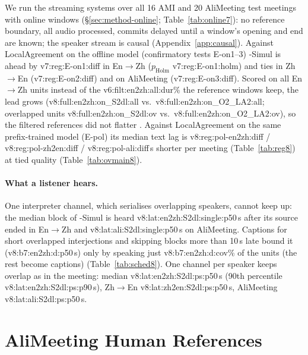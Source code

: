 We run the streaming systems over all 16 AMI and 20 AliMeeting test meetings with online windows
(\S\ref{sec:method-online}; Table~\ref{tab:online7}): no reference boundary, all audio processed, commits delayed until a
window's opening and end are known; the speaker stream is causal (Appendix~\ref{app:causal}). Against
LocalAgreement on the offline model (confirmatory tests E-on1--3) \sys{}-Simul is ahead by \num{v7:reg:E-on1:diff} in
En$\rightarrow$Zh ($p_\text{Holm}$ \num{v7:reg:E-on1:holm}) and ties in Zh$\rightarrow$En (\num{v7:reg:E-on2:diff}) and on
AliMeeting (\num{v7:reg:E-on3:diff}). Scored on all En$\rightarrow$Zh units instead of the
\num{v6:filt:en2zh:all:dur}\% the reference windows keep, the lead grows
(\num{v8:full:en2zh:on_S2dl:all} vs.\ \num{v8:full:en2zh:on_O2_LA2:all}; overlapped units \num{v8:full:en2zh:on_S2dl:ov}
vs.\ \num{v8:full:en2zh:on_O2_LA2:ov}), so the filtered references did not flatter \sys{}. Against LocalAgreement on
the same prefix-trained model (E-pol) its median text lag is \num{v8:reg:pol-en2zh:diff} / \num{v8:reg:pol-zh2en:diff} /
\num{v8:reg:pol-ali:diff}\,s shorter per meeting (Table~\ref{tab:reg8}) at tied quality (Table~\ref{tab:ovmain8}).

\paragraph{What a listener hears.} One interpreter channel, which serialises overlapping speakers, cannot keep up: the
median block of \sys{}-Simul is heard \num{v8:lat:en2zh:S2dl:single:p50}\,s after its source ended in
En$\rightarrow$Zh and \num{v8:lat:ali:S2dl:single:p50}\,s on AliMeeting. Captions for short overlapped interjections and skipping blocks
more than 10\,s late bound it (\num{v8:b7:en2zh:d:p50}\,s) only by speaking just \num{v8:b7:en2zh:d:cov}\% of the units (the rest become captions)
(Table~\ref{tab:sched8}). One channel per speaker keeps overlap as in the meeting: median \num{v8:lat:en2zh:S2dl:ps:p50}\,s
(90th percentile \num{v8:lat:en2zh:S2dl:ps:p90}\,s), Zh$\rightarrow$En \num{v8:lat:zh2en:S2dl:ps:p50}\,s, AliMeeting
\num{v8:lat:ali:S2dl:ps:p50}\,s.


\section{AliMeeting Human References}
\label{app:v9}

